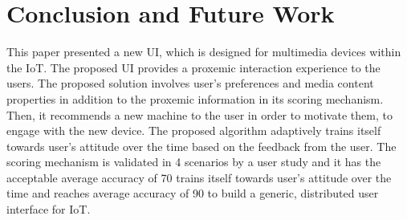 \documentclass[runningheads,a4paper]{llncs}
\begin{document}
\section{Conclusion and Future Work}\label{references}
This paper presented a new UI, which is designed for multimedia devices within
the IoT. The proposed UI provides a proxemic interaction experience to the
users. The proposed solution involves user’s preferences and media content properties in addition to the proxemic information in its scoring mechanism. Then,
it recommends a new machine to the user in order to motivate them, to engage
with the new device. The proposed algorithm adaptively trains itself towards
user’s attitude over the time based on the feedback from the user. The scoring
mechanism is validated in 4 scenarios by a user study and it has the acceptable
average accuracy of 70%
trains itself towards user’s attitude over the time and reaches average accuracy
of 90%
to build a generic, distributed user interface for IoT.
\end{document}
